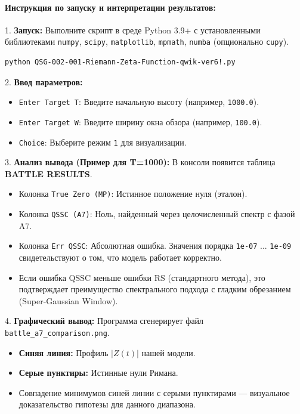 \documentclass{article}
\numberwithin{equation}{section}
\theoremstyle{plain}
\theoremstyle{definition}
\theoremstyle{remark}
\begin{document}
\paragraph{Инструкция по запуску и интерпретации результатов:}

1. \textbf{Запуск:} Выполните скрипт в среде Python 3.9+ с установленными библиотеками \texttt{numpy}, \texttt{scipy}, \texttt{matplotlib}, \texttt{mpmath}, \texttt{numba} (опционально \texttt{cupy}).
\begin{verbatim}
python QSG-002-001-Riemann-Zeta-Function-qwik-ver6!.py
\end{verbatim}

2. \textbf{Ввод параметров:}
\begin{itemize}
    \item \texttt{Enter Target T}: Введите начальную высоту (например, \texttt{1000.0}).
    \item \texttt{Enter Target W}: Введите ширину окна обзора (например, \texttt{100.0}).
    \item \texttt{Choice}: Выберите режим \texttt{1} для визуализации.
\end{itemize}

3. \textbf{Анализ вывода (Пример для T=1000):}
В консоли появится таблица \textbf{BATTLE RESULTS}.
\begin{itemize}
    \item Колонка \texttt{True Zero (MP)}: Истинное положение нуля (эталон).
    \item Колонка \texttt{QSSC (A7)}: Ноль, найденный через целочисленный спектр с фазой A7.
    \item Колонка \texttt{Err QSSC}: Абсолютная ошибка. Значения порядка \texttt{1e-07} ... \texttt{1e-09} свидетельствуют о том, что модель работает корректно.
    \item Если ошибка QSSC меньше ошибки RS (стандартного метода), это подтверждает преимущество спектрального подхода с гладким обрезанием (Super-Gaussian Window).
\end{itemize}

4. \textbf{Графический вывод:}
Программа сгенерирует файл \texttt{battle\_a7\_comparison.png}.
\begin{itemize}
    \item \textbf{Синяя линия:} Профиль $|Z(t)|$ нашей модели.
    \item \textbf{Серые пунктиры:} Истинные нули Римана.
    \item Совпадение минимумов синей линии с серыми пунктирами — визуальное доказательство гипотезы для данного диапазона.
\end{itemize}
\end{document}

